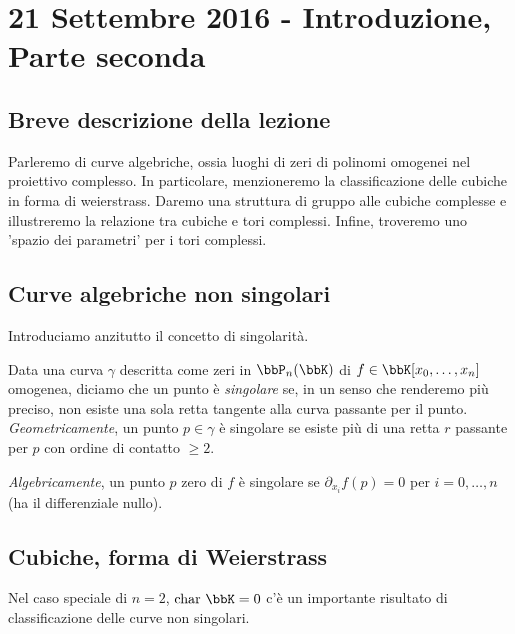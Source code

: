 \chapter{21 Settembre 2016 - Introduzione, Parte seconda}
\section{Breve descrizione della lezione}
Parleremo di curve algebriche, ossia luoghi di zeri di polinomi omogenei nel proiettivo complesso. In particolare, menzioneremo la classificazione delle cubiche in forma di weierstrass. Daremo una struttura di gruppo alle cubiche complesse e illustreremo la relazione tra cubiche e tori complessi. Infine, troveremo uno 'spazio dei parametri' per i tori complessi.
\section{Curve algebriche non singolari}

Introduciamo anzitutto il concetto di singolarità.

Data una curva $\gamma$ descritta come zeri in $\bbP_n(\bbK)$ di $f \in \bbK[x_0, \ldots,x_n]$ omogenea, diciamo che un punto è 
\textit{singolare} se, in un senso che renderemo più preciso, non esiste una sola retta tangente alla curva passante per il punto. \textit{Geometricamente}, un punto $p \in \gamma$ è singolare se esiste più di una retta $r$ passante per $p$ con ordine di contatto $\geq 2$. 
\vspace{1em}


\textit{Algebricamente}, un punto $p$ zero di $f$ è singolare se $\partial_{x_i}f(p)=0$ per $i=0,\ldots,n$ (ha il differenziale nullo). 


\section{Cubiche, forma di Weierstrass}
Nel caso speciale di $n=2$, $\chr \bbK = 0$ c'è un importante risultato di classificazione delle curve non singolari. 

